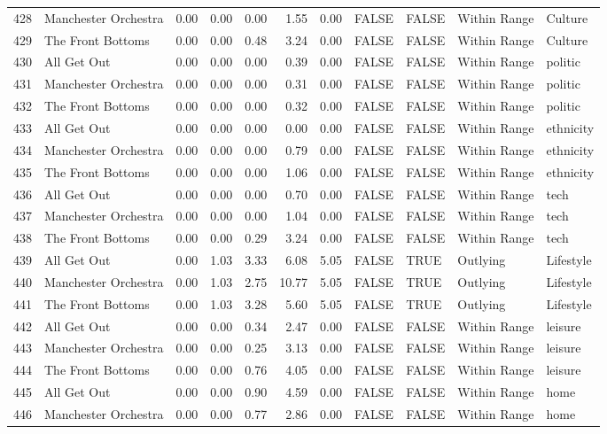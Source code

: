 \begin{table}[ht]
\begin{tabular}{rlrrrrrllll}
  428 & Manchester Orchestra & 0.00 & 0.00 & 0.00 & 1.55 & 0.00 & FALSE & FALSE & Within Range & Culture \\ 
  429 & The Front Bottoms & 0.00 & 0.00 & 0.48 & 3.24 & 0.00 & FALSE & FALSE & Within Range & Culture \\ 
  430 & All Get Out & 0.00 & 0.00 & 0.00 & 0.39 & 0.00 & FALSE & FALSE & Within Range & politic \\ 
  431 & Manchester Orchestra & 0.00 & 0.00 & 0.00 & 0.31 & 0.00 & FALSE & FALSE & Within Range & politic \\ 
  432 & The Front Bottoms & 0.00 & 0.00 & 0.00 & 0.32 & 0.00 & FALSE & FALSE & Within Range & politic \\ 
  433 & All Get Out & 0.00 & 0.00 & 0.00 & 0.00 & 0.00 & FALSE & FALSE & Within Range & ethnicity \\ 
  434 & Manchester Orchestra & 0.00 & 0.00 & 0.00 & 0.79 & 0.00 & FALSE & FALSE & Within Range & ethnicity \\ 
  435 & The Front Bottoms & 0.00 & 0.00 & 0.00 & 1.06 & 0.00 & FALSE & FALSE & Within Range & ethnicity \\ 
  436 & All Get Out & 0.00 & 0.00 & 0.00 & 0.70 & 0.00 & FALSE & FALSE & Within Range & tech \\ 
  437 & Manchester Orchestra & 0.00 & 0.00 & 0.00 & 1.04 & 0.00 & FALSE & FALSE & Within Range & tech \\ 
  438 & The Front Bottoms & 0.00 & 0.00 & 0.29 & 3.24 & 0.00 & FALSE & FALSE & Within Range & tech \\ 
  439 & All Get Out & 0.00 & 1.03 & 3.33 & 6.08 & 5.05 & FALSE & TRUE & Outlying & Lifestyle \\ 
  440 & Manchester Orchestra & 0.00 & 1.03 & 2.75 & 10.77 & 5.05 & FALSE & TRUE & Outlying & Lifestyle \\ 
  441 & The Front Bottoms & 0.00 & 1.03 & 3.28 & 5.60 & 5.05 & FALSE & TRUE & Outlying & Lifestyle \\ 
  442 & All Get Out & 0.00 & 0.00 & 0.34 & 2.47 & 0.00 & FALSE & FALSE & Within Range & leisure \\ 
  443 & Manchester Orchestra & 0.00 & 0.00 & 0.25 & 3.13 & 0.00 & FALSE & FALSE & Within Range & leisure \\ 
  444 & The Front Bottoms & 0.00 & 0.00 & 0.76 & 4.05 & 0.00 & FALSE & FALSE & Within Range & leisure \\ 
  445 & All Get Out & 0.00 & 0.00 & 0.90 & 4.59 & 0.00 & FALSE & FALSE & Within Range & home \\ 
  446 & Manchester Orchestra & 0.00 & 0.00 & 0.77 & 2.86 & 0.00 & FALSE & FALSE & Within Range & home \\ 

\end{tabular}
\end{table}
